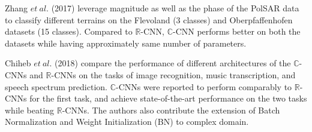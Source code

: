 Zhang $et \ al.$ (2017) \cite{polsarzhang2017complex} leverage magnitude as well as the phase of the PolSAR data to classify different terrains on the Flevoland (3 classes) and Oberpfaffenhofen datasets (15 classes). Compared to $\mathbb{R}$-CNN, $\mathbb{C}$-CNN performs better on both the datasets while having approximately same number of parameters.  

Chiheb $et \ al.$ (2018) \cite{trabelsi2018deep} compare the performance of different architectures of the $\mathbb{C}$-CNNs and $\mathbb{R}$-CNNs on the tasks of image recognition, music transcription, and speech spectrum prediction. $\mathbb{C}$-CNNs were reported to perform comparably to $\mathbb{R}$-CNNs for the first task, and achieve state-of-the-art performance on the two tasks while beating $\mathbb{R}$-CNNs. The authors also contribute the extension of Batch Normalization and Weight Initialization (BN) to complex domain. 
